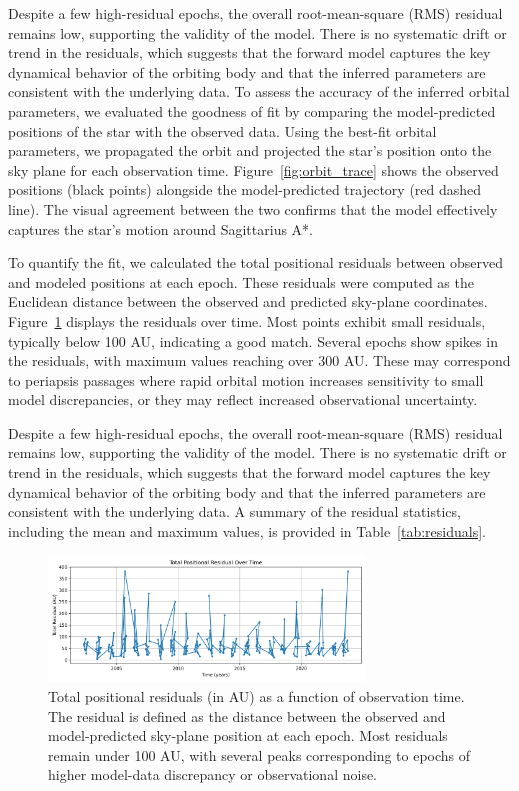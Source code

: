 \documentclass[linenumbers,trackchanges,astrosymb,]{aastex7}
\begin{document}
Despite a few high-residual epochs, the overall root-mean-square (RMS) residual remains low, supporting the validity of the model. There is no systematic drift or trend in the residuals, which suggests that the forward model captures the key dynamical behavior of the orbiting body and that the inferred parameters are consistent with the underlying data.
To assess the accuracy of the inferred orbital parameters, we evaluated the goodness of fit by comparing the model-predicted positions of the star with the observed data. Using the best-fit orbital parameters, we propagated the orbit and projected the star’s position onto the sky plane for each observation time. Figure~\ref{fig:orbit_trace} shows the observed positions (black points) alongside the model-predicted trajectory (red dashed line). The visual agreement between the two confirms that the model effectively captures the star’s motion around Sagittarius A*.

To quantify the fit, we calculated the total positional residuals between observed and modeled positions at each epoch. These residuals were computed as the Euclidean distance between the observed and predicted sky-plane coordinates. Figure~\ref{fig:residuals_time} displays the residuals over time. Most points exhibit small residuals, typically below 100 AU, indicating a good match. Several epochs show spikes in the residuals, with maximum values reaching over 300 AU. These may correspond to periapsis passages where rapid orbital motion increases sensitivity to small model discrepancies, or they may reflect increased observational uncertainty.

Despite a few high-residual epochs, the overall root-mean-square (RMS) residual remains low, supporting the validity of the model. There is no systematic drift or trend in the residuals, which suggests that the forward model captures the key dynamical behavior of the orbiting body and that the inferred parameters are consistent with the underlying data. A summary of the residual statistics, including the mean and maximum values, is provided in Table~\ref{tab:residuals}.

\begin{figure}[ht!]
\centering
\includegraphics[width=0.75\textwidth]{residuals_over_time.png}
\caption{
Total positional residuals (in AU) as a function of observation time. The residual is defined as the distance between the observed and model-predicted sky-plane position at each epoch. Most residuals remain under 100 AU, with several peaks corresponding to epochs of higher model-data discrepancy or observational noise.
}


\label{fig:residuals_time}
\end{figure}
\end{document}
